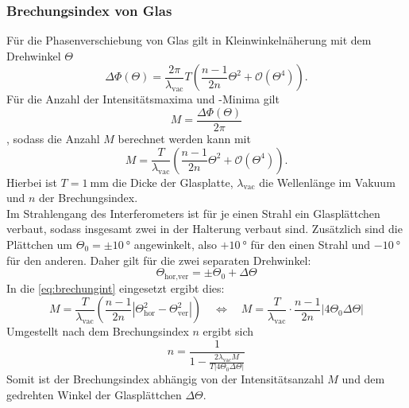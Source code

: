 \subsubsection{Brechungsindex von Glas}
Für die Phasenverschiebung von Glas gilt in Kleinwinkelnäherung mit dem Drehwinkel $\Theta$
\begin{equation}
    \Delta\Phi\left(\Theta\right) = \frac{2\pi}{\lambda_{\text{vac}}}T\left(\frac{n - 1}{2n}\Theta^2 + \mathcal{O}\left(\Theta^4\right)\right).
    \label{eq:poli}
\end{equation}
Für die Anzahl der Intensitätsmaxima und -Minima gilt
\begin{equation}
    M = \frac{\Delta\Phi\left(\Theta\right)}{2\pi}
\end{equation}
, sodass die Anzahl $M$ berechnet werden kann mit
\begin{equation}
    M = \frac{T}{\lambda_{\text{vac}}}\left(\frac{n - 1}{2n}\Theta^2 + \mathcal{O}\left(\Theta^4\right)\right).
    \label{eq:brechungint}
\end{equation}
Hierbei ist $T = \SI{1}{\milli\metre}$ die Dicke der Glasplatte, $\lambda_{\text{vac}}$ die Wellenlänge im Vakuum und $n$ der Brechungsindex.\\
Im Strahlengang des Interferometers ist für je einen Strahl ein Glasplättchen verbaut, sodass insgesamt zwei in der Halterung verbaut sind.
Zusätzlich sind die Plättchen um $\Theta_0 = \pm \SI{10}{\degree}$ angewinkelt, also $+\SI{10}{\degree}$ für den einen Strahl und $-\SI{10}{\degree}$ für den anderen.
Daher gilt für die zwei separaten Drehwinkel:
\begin{equation}
    \Theta_{\text{hor,ver}} = \pm\Theta_0 + \Delta\Theta
\end{equation}
In die \autoref{eq:brechungint} eingesetzt ergibt dies:
\begin{equation}
    M = \frac{T}{\lambda_{\text{vac}}}\left(\frac{n - 1}{2n}|\Theta_{\text{hor}}^2 - \Theta_{\text{ver}}^2|\right) \quad \iff \quad M = \frac{T}{\lambda_{\text{vac}}}\cdot\frac{n - 1}{2n}|4\Theta_0 \Delta\Theta|
\end{equation}
Umgestellt nach dem Brechungsindex $n$ ergibt sich
\begin{equation}
    n = \frac{1}{1 - \frac{2\lambda_{\text{vac}}M}{T|4\Theta_0\Delta\Theta|}}
    \label{eq:brechungsindex}
\end{equation}
Somit ist der Brechungsindex abhängig von der Intensitätsanzahl $M$ und dem gedrehten Winkel der Glasplättchen $\Delta\Theta$.
